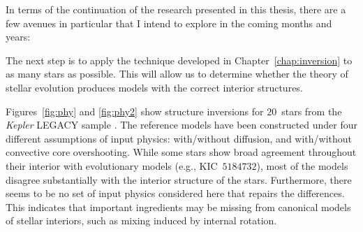 In terms of the continuation of the research presented in this thesis, there are a few avenues in particular that I intend to explore in the coming months and years: 
\begin{description}
    \setlength{\itemindent}{0pt}
    \item[Structure inversions of more stars.]
    The next step is to apply the technique developed in Chapter~\ref{chap:inversion} to as many stars as possible. 
    This will allow us to determine whether the theory of stellar evolution produces models with the correct interior structures. 
    
    Figures~\ref{fig:phy} and \ref{fig:phy2} show structure inversions for $20$~stars from the \emph{Kepler} LEGACY sample \citep{2017ApJ...835..172L}. 
    The reference models have been constructed under four different assumptions of input physics: with/without diffusion, and with/without convective core overshooting. 
    While some stars show broad agreement throughout their interior with evolutionary models (e.g., KIC~$5184732$), most of the models disagree substantially with the interior structure of the stars. 
    Furthermore, there seems to be no set of input physics considered here that repairs the differences. 
    This indicates that important ingredients may be missing from canonical models of stellar interiors, such as mixing induced by internal rotation. 


\end{description}
